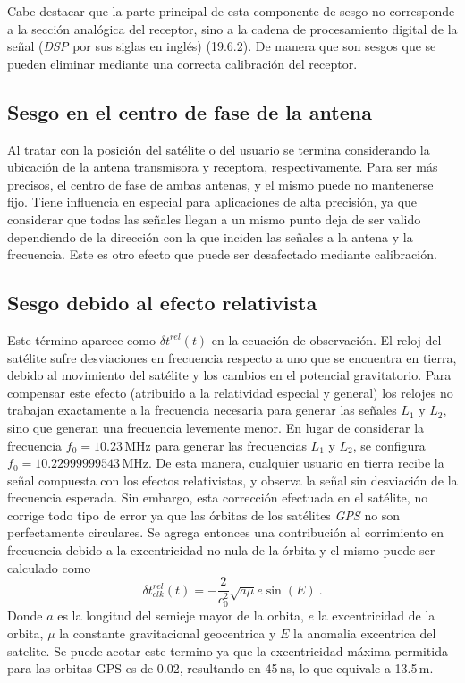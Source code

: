 \documentclass[a4paper,12pt,oneside,onecolumn,final,openright]{book}%
\begin{document}
	 Cabe destacar que la parte principal de esta componente de sesgo no corresponde a la sección analógica del receptor, sino a la cadena de procesamiento digital de la señal (\textit{DSP} por sus siglas en inglés) \cite{handbook}(19.6.2). De manera que son sesgos que se pueden eliminar mediante una correcta calibración del receptor.
\subsection*{Sesgo en el centro de fase de la antena}
	Al tratar con la posición del satélite o del usuario se termina considerando la ubicación de la antena transmisora y receptora, respectivamente. Para ser más precisos, el centro de fase de ambas antenas, y el mismo puede no mantenerse fijo. Tiene influencia en especial para aplicaciones de alta precisión, ya que considerar que todas las señales llegan a un mismo punto deja de ser valido dependiendo de la dirección con la que inciden las señales a la antena y la frecuencia. Este es otro efecto que puede ser desafectado mediante calibración.
	 
\subsection*{Sesgo debido al efecto relativista}
	Este término aparece como $\delta t^{rel}(t)$ en la ecuación de observación. El reloj del satélite sufre desviaciones en frecuencia respecto a uno que se encuentra en tierra, debido al movimiento del satélite y los cambios en el potencial gravitatorio. Para compensar este efecto (atribuido a la relatividad especial y general) los relojes no trabajan exactamente a la frecuencia necesaria para generar las señales $L_1$ y $L_2$, sino que generan una frecuencia levemente menor. En lugar de considerar la frecuencia $f_0 = 10.23$\,MHz para generar las frecuencias $L_1$ y $L_2$, se configura $f_0 = 10.22999999543$\,MHz. De esta manera, cualquier usuario en tierra recibe la señal compuesta con los efectos relativistas, y observa la señal sin desviación de la frecuencia esperada. Sin embargo, esta corrección efectuada en el satélite, no corrige todo tipo de error ya que las órbitas de los satélites \textit{GPS} no son perfectamente circulares. Se agrega entonces una contribución al corrimiento en frecuencia debido a la excentricidad no nula de la órbita y el mismo puede ser calculado como
\begin{equation}
	\delta t^{rel}_{clk}(t) = -\dfrac{2}{c_0^2}\sqrt{a\mu}e\sin(E) \ .
\end{equation}
	Donde $a$ es la longitud del semieje mayor de la orbita, $e$ la excentricidad de la orbita, $\mu$ la constante gravitacional geocentrica y $E$ la anomalia excentrica del satelite. Se puede acotar este termino ya que la excentricidad máxima permitida para las orbitas GPS es de 0.02, resultando en 45\,ns, lo que equivale a 13.5\,m.
	
\end{document}
